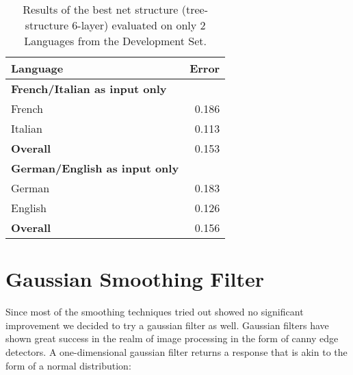 \begin{table}[h!]
\label{tab:eval2L}
\centering
\begin{tabular}{| l | r |}
	\hline
	\textbf{Language} & \textbf{Error}  \\
	\hline
	\textbf{French/Italian as input only} & \\
	 French &  0.186 \\
	Italian & 0.113 \\
	\hline
	\textbf{Overall} & 0.153 \\
	\hline
	\textbf{German/English as input only} & \\
	German & 0.183 \\
	English & 0.126 \\
	\hline
	\textbf{Overall} & 0.156 \\
	\hline
\end{tabular}
\caption{Results of the best net structure (tree-structure 6-layer) evaluated on only 2 Languages from the Development Set.}
\end{table}

\section{Gaussian Smoothing Filter}
\label{sec:eval:GSF}
Since most of the smoothing techniques tried out showed no significant improvement we decided to try a gaussian filter as well. Gaussian filters have shown great success in the realm of image processing in the form of canny edge detectors. 
A one-dimensional gaussian filter returns a response that is akin to the form of a normal distribution:

